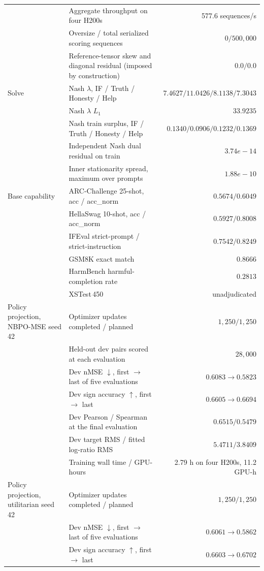\begin{tabular}{p{2.9cm}p{6.0cm}r}
 & Aggregate throughput on four H200s & \textrm{577.6 sequences/s}\\
 & Oversize / total serialized scoring sequences & $0 / 500{,}000$\\
 & Reference-tensor skew and diagonal residual (imposed by construction) & $0.0 / 0.0$\\
Solve & Nash $\lambda$, IF / Truth / Honesty / Help & $7.4627 / 11.0426 / 8.1138 / 7.3043$\\
 & Nash $\lambda$ $L_1$ & $33.9235$\\
 & Nash train surplus, IF / Truth / Honesty / Help & $0.1340 / 0.0906 / 0.1232 / 0.1369$\\
 & Independent Nash dual residual on train & $3.74e-14$\\
 & Inner stationarity spread, maximum over prompts & $1.88e-10$\\
Base capability & ARC-Challenge 25-shot, acc / acc\_norm & $0.5674 / 0.6049$\\
 & HellaSwag 10-shot, acc / acc\_norm & $0.5927 / 0.8008$\\
 & IFEval strict-prompt / strict-instruction & $0.7542 / 0.8249$\\
 & GSM8K exact match & $0.8666$\\
 & HarmBench harmful-completion rate & $0.2813$\\
 & XSTest\,450 & \textrm{unadjudicated}\\
Policy projection, NBPO-MSE seed 42 & Optimizer updates completed / planned & $1{,}250 / 1{,}250$\\
 & Held-out dev pairs scored at each evaluation & $28{,}000$\\
 & Dev nMSE $\downarrow$, first $\to$ last of five evaluations & $0.6083 \to 0.5823$\\
 & Dev sign accuracy $\uparrow$, first $\to$ last & $0.6605 \to 0.6694$\\
 & Dev Pearson / Spearman at the final evaluation & $0.6515 / 0.5479$\\
 & Dev target RMS / fitted log-ratio RMS & $5.4711 / 3.8409$\\
 & Training wall time / GPU-hours & \textrm{2.79 h on four H200s, 11.2 GPU-h}\\
Policy projection, utilitarian seed 42 & Optimizer updates completed / planned & $1{,}250 / 1{,}250$\\
 & Dev nMSE $\downarrow$, first $\to$ last of five evaluations & $0.6061 \to 0.5862$\\
 & Dev sign accuracy $\uparrow$, first $\to$ last & $0.6603 \to 0.6702$\\

\end{tabular}
